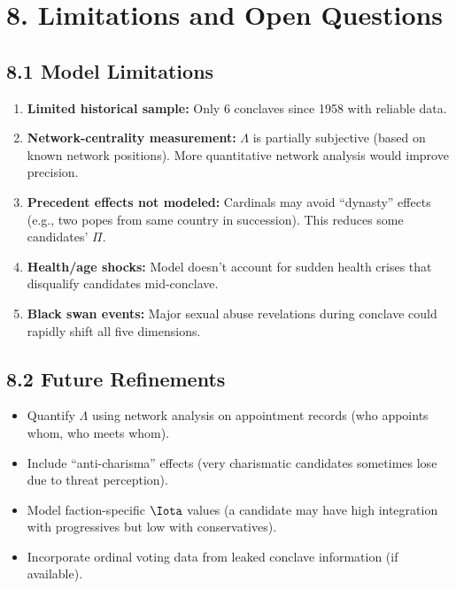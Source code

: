 \section{8. Limitations and Open Questions}

\subsection{8.1 Model Limitations}

\begin{enumerate}
\item \textbf{Limited historical sample:} Only 6 conclaves since 1958 with reliable data.

\item \textbf{Network-centrality measurement:} $\Lambda$ is partially subjective (based on known network positions). More quantitative network analysis would improve precision.

\item \textbf{Precedent effects not modeled:} Cardinals may avoid ``dynasty'' effects (e.g., two popes from same country in succession). This reduces some candidates' $\Pi$.

\item \textbf{Health/age shocks:} Model doesn't account for sudden health crises that disqualify candidates mid-conclave.

\item \textbf{Black swan events:} Major sexual abuse revelations during conclave could rapidly shift all five dimensions.
\end{enumerate}

\subsection{8.2 Future Refinements}

\begin{itemize}
\item Quantify $\Lambda$ using network analysis on appointment records (who appoints whom, who meets whom).
\item Include ``anti-charisma'' effects (very charismatic candidates sometimes lose due to threat perception).
\item Model faction-specific $\Iota$ values (a candidate may have high integration with progressives but low with conservatives).
\item Incorporate ordinal voting data from leaked conclave information (if available).
\end{itemize}

